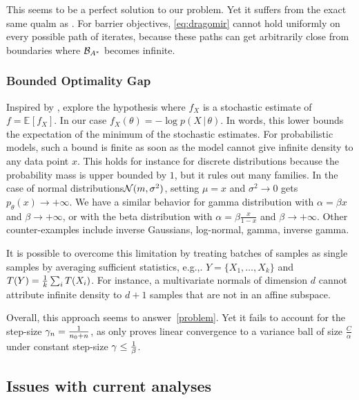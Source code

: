 \documentclass[twoside]{article}
\newcommand*{\expect}[2][]{\ensuremath{\mathbb{E}_{#1} \left[ #2 \right] }} %
\newcommand*{\expecti}[2][]{\ensuremath{\mathbb{E}_{#1} [ #2 ] }} %
\newcommand{\cond}{\,\vert\,}
\newcommand{\logpart}{A}
\newcommand{\bregmanconj}{\cB_{\logpart^*}}
\newcommand{\nat}{\theta}
\newcommand{\lr}{\gamma} %
\newcommand{\stgcvx}{\alpha} %
\newcommand{\smooth}{\beta} %
\begin{document}
This seems to be a perfect solution to our problem. Yet it suffers from the exact same qualm as \citet{hanzely2018fastest}. For barrier objectives, \cref{eq:dragomir} cannot hold uniformly on every possible path of iterates, because these paths can get arbitrarily close from boundaries where $\bregmanconj$ becomes infinite.

\subsubsection{Bounded Optimality Gap}
Inspired by \citet{loizou2021stochastic}, \citet{dorazio2021stochastic} explore the hypothesis
\alignn{
\min_\nat f(\nat) - \expect[X]{\min_\nat f_X(\nat)} \leq C,
\label{eq:dorazio}
}
where $f_X$ is a stochastic estimate of $f = \expecti{f_X}$. In our case $f_X(\nat) = - \log p(X\cond \nat)$.
In words, this lower bounds the expectation of the minimum of the stochastic estimates.
For probabilistic models, such a bound is finite as soon as the model cannot give infinite density to any data point $x$.
This holds for instance for discrete distributions because the probability mass is upper bounded by $1$,
but it rules out  many families.
In the case of normal distributions${\mathcal N}(m, \sigma^2)$, setting $\mu=x$ and $\sigma^2 \rightarrow 0$ gets $p_\nat (x) \rightarrow +\infty$. We have a similar behavior for gamma distribution with $\alpha = \beta x$ and $\beta \rightarrow +\infty$, or with the beta distribution with $\alpha=\beta \frac{x}{1-x}$ and $\beta \rightarrow +\infty$.
 Other counter-examples include inverse Gaussians, log-normal, gamma, inverse gamma.

It is possible to overcome this limitation by treating batches of samples as single samples by averaging sufficient statistics, e.g.,. $Y = \{X_1, \dots, X_k\}$ and $T(Y) = \frac{1}{k}\sum_i T(X_i)$.
For instance, a multivariate normals of dimension $d$ cannot attribute infinite density to $d+1$ samples that are not in an affine subspace.

Overall, this approach seems to answer~\eqref{problem}. Yet it fails to account for the step-size $\lr_n = \inv{n_0+n}$, as \citet[Thm.1]{dorazio2021stochastic} only proves linear convergence to a variance ball of size $\frac{C}{\stgcvx}$ under constant step-size $\lr \leq \inv{\smooth}$.

\subsection{Issues with current analyses}
\end{document}
